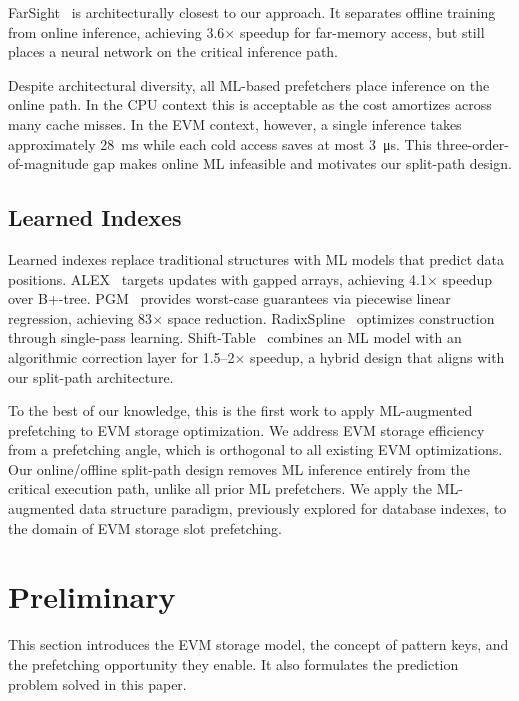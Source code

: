 \documentclass[conference]{IEEEtran}
\begin{document}
FarSight~\cite{farsight} is architecturally closest to our approach. It separates offline training from online inference, achieving 3.6$\times$ speedup for far-memory access, but still places a neural network on the critical inference path.

Despite architectural diversity, all ML-based prefetchers place inference on the online path. In the CPU context this is acceptable as the cost amortizes across many cache misses. In the EVM context, however, a single inference takes approximately \qty{28}{\milli\second} while each cold access saves at most \qty{3}{\micro\second}. This three-order-of-magnitude gap makes online ML infeasible and motivates our split-path design.

\subsection{Learned Indexes}
\label{sec:learned-indexes}

Learned indexes replace traditional structures with ML models that predict data positions. ALEX~\cite{alex} targets updates with gapped arrays, achieving 4.1$\times$ speedup over B+-tree. PGM~\cite{pgm} provides worst-case guarantees via piecewise linear regression, achieving 83$\times$ space reduction. RadixSpline~\cite{radixspline} optimizes construction through single-pass learning. Shift-Table~\cite{shifttable} combines an ML model with an algorithmic correction layer for 1.5--2$\times$ speedup, a hybrid design that aligns with our split-path architecture. 

To the best of our knowledge, this is the first work to apply ML-augmented prefetching to EVM storage optimization. We address EVM storage efficiency from a prefetching angle, which is orthogonal to all existing EVM optimizations. Our online/offline split-path design removes ML inference entirely from the critical execution path, unlike all prior ML prefetchers. We apply the ML-augmented data structure paradigm, previously explored for database indexes, to the domain of EVM storage slot prefetching.

\section{Preliminary}
\label{sec:preliminary}

This section introduces the EVM storage model, the concept of pattern keys, and the
prefetching opportunity they enable. It also formulates the prediction problem solved in
this paper.
\end{document}
